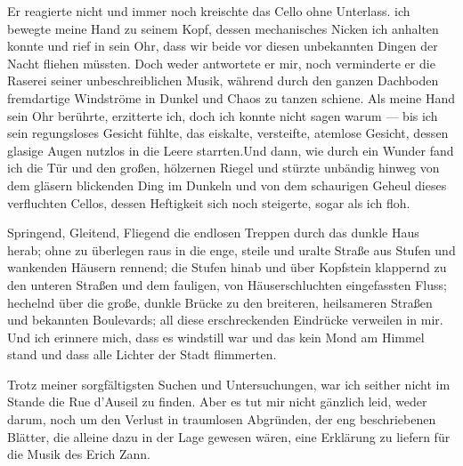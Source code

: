 \documentclass[a4paper]{memoir}
\begin{document}
Er reagierte nicht und immer noch kreischte das Cello ohne Unterlass. ich bewegte meine Hand zu seinem Kopf, dessen mechanisches Nicken ich anhalten konnte und rief in sein Ohr, dass wir beide vor diesen unbekannten Dingen der Nacht fliehen müssten. Doch weder antwortete er mir, noch verminderte er die Raserei seiner unbeschreiblichen Musik, während durch den ganzen Dachboden fremdartige Windströme in Dunkel und Chaos zu tanzen schiene. Als meine Hand sein Ohr berührte, erzitterte ich, doch ich konnte nicht sagen warum --- bis ich sein regungsloses Gesicht fühlte, das eiskalte, versteifte, atemlose Gesicht, dessen glasige Augen nutzlos in die Leere starrten.Und dann, wie durch ein Wunder fand ich die Tür und den großen, hölzernen Riegel und stürzte unbändig hinweg von dem gläsern blickenden Ding im Dunkeln und von dem schaurigen Geheul dieses verfluchten Cellos, dessen Heftigkeit sich noch steigerte, sogar als ich floh.

Springend, Gleitend, Fliegend die endlosen Treppen durch das dunkle Haus herab; ohne zu überlegen raus in die enge, steile und uralte Straße aus Stufen und wankenden Häusern rennend; die Stufen hinab und über Kopfstein klappernd zu den unteren Straßen und dem fauligen, von Häuserschluchten eingefassten Fluss; hechelnd über die große, dunkle Brücke zu den breiteren, heilsameren Straßen und bekannten Boulevards; all diese erschreckenden Eindrücke verweilen in mir. Und ich erinnere mich, dass es windstill war und das kein Mond am Himmel stand und dass alle Lichter der Stadt flimmerten.

Trotz meiner sorgfältigsten Suchen und Untersuchungen, war ich seither nicht im Stande die Rue d'Auseil zu finden. Aber es tut mir nicht gänzlich leid, weder darum, noch um den Verlust in traumlosen Abgründen, der eng beschriebenen Blätter, die alleine dazu in der Lage gewesen wären, eine Erklärung zu liefern für die Musik des Erich Zann.
\end{document}
